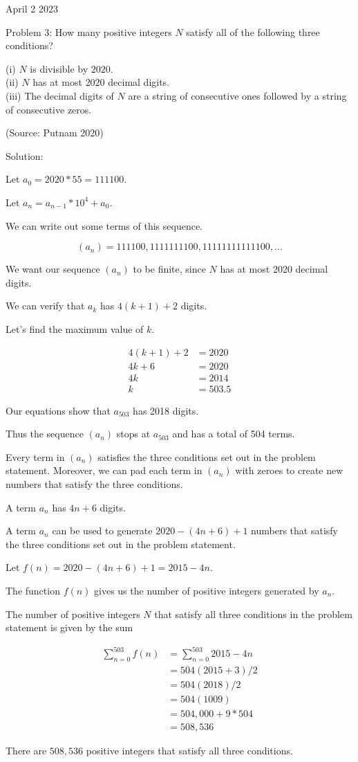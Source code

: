 April 2 2023

Problem 3: How many positive integers $N$ satisfy all of the following three conditions?

(i) $N$ is divisible by $2020$.\\
(ii) $N$ has at most $2020$ decimal digits.\\
(iii) The decimal digits of $N$ are a string of consecutive ones followed by a string of consecutive zeros.

(Source: Putnam 2020)

Solution:

Let $a_0 = 2020*55 = 111100$.

Let $a_n = a_{n-1}*10^4 + a_0$.

We can write out some terms of this sequence.

$$(a_n) = 111100, 1111111100, 11111111111100, ...$$

We want our sequence $(a_n)$ to be finite, since $N$ has at most 2020 decimal digits.

We can verify that $a_k$ has $4(k+1) + 2$ digits.

Let's find the maximum value of $k$.

\begin{align*}
4(k + 1) + 2 &= 2020 \\
4k + 6 &= 2020 \\
4k &= 2014 \\
k &= 503.5
\end{align*}

Our equations show that $a_{503}$ has 2018 digits.

Thus the sequence $(a_n)$ stops at $a_{503}$ and has a total of 504 terms.

Every term in $(a_n)$ satisfies the three conditions set out in the problem statement. Moreover, we can pad each term in $(a_n)$ with zeroes to create new numbers that satisfy the three conditions.

A term $a_n$ has $4n + 6$ digits.

A term $a_n$ can be used to generate $2020 - (4n + 6) + 1$ numbers that satisfy the three conditions set out in the problem statement.

Let $f(n) = 2020 - (4n + 6) + 1 = 2015 - 4n$.

The function $f(n)$ gives us the number of positive integers generated by $a_n$. 

The number of positive integers $N$ that satisfy all three conditions in the problem statement is given by the sum

\begin{align*}
\sum_{n = 0}^{503} f(n) &= \sum_{n = 0}^{503} 2015 - 4n \\
&= 504(2015 + 3)/2 \\
&= 504(2018)/2 \\
&= 504(1009) \\
&= 504,000 + 9 * 504 \\
&= 508,536
\end{align*}

There are $\boxed{508,536}$ positive integers that satisfy all three conditions.
